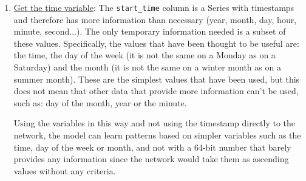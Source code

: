 \begin{enumerate}
\begin{table}[H]
\begin{tabular}{c|rrr}
        \bottomrule
    \end{tabular}
    \cprotect\caption{Example of a dataset containing the intervals.}
    \label{tab:intervals_example}
    \end{table}
    
    Primarily, the code used for this step makes use of the \small{\verb|pivot()|} \normalsize  pandas function:
    \begin{verbatim}
# Prepare the new columns names for each station
df["quantity_index"] = "quantity_" + \
                        df["from_station_id"].astype("str")

# We don't need from_station_id anymore
df = df.drop(columns=["from_station_id"])

# Make the pivot around quantity_index column and
# set the value of the column the same value as
# quantity from before saving quantity from
df = df.pivot(columns='quantity_index', values='quantity')

# If station any interval didn't have any trips for
# a station, then fill it with 0
return df.fillna(0)
    \end{verbatim}
    
    If you compare table \ref{tab:starttime_withsid} with table \ref{tab:intervals_example} you can see that the amount of data has been reduced considerably and only the necessary information that the network will need has been selected.
    \newline
    
    \item \underline{Get the time variable}: The \small{\verb|start_time|} \normalsize  column is a Series with timestamps and therefore has more information than necessary (year, month, day, hour, minute, second...). The only temporary information needed is a subset of these values. Specifically, the values that have been thought to be useful are: the time, the day of the week (it is not the same on a Monday as on a Saturday) and the month (it is not the same on a winter month as on a summer month). These are the simplest values that have been used, but this does not mean that other data that provide more information can't be used, such as: day of the month, year or the minute. 
    \newline
    
  Using the variables in this way and not using the timestamp directly to the network, the model can learn patterns based on simpler variables such as the time, day of the week or month, and not with a 64-bit number that barely provides any information since the network would take them as ascending values without any criteria.
    

\end{enumerate}
